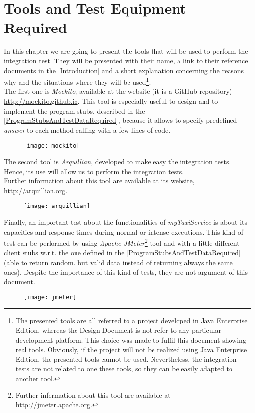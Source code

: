 \documentclass[\mainpath/main]{subfiles}
\begin{document}
\chapter{Tools and Test Equipment Required} %
\label{ToolsAndTestEquipmentRequired}

\setmyfancystyle

In this chapter we are going to present the tools that will be used to perform the integration test. They will be presented with their name, a link to their reference documents in the \autoref{Introduction} and a short explanation concerning the reasons why and the situations where they will be used\footnote{The presented tools are all referred to a project developed in Java Enterprise Edition, whereas the Design Document is not refer to any particular development platform. This choice was made to fulfil this document showing real tools. Obviously, if the project will not be realized using Java Enterprise Edition, the presented tools cannot be used. Nevertheless, the integration tests are not related to one these tools, so they can be easily adapted to another tool.}.\\
The first one is \textit{Mockito}, available at the website (it is a GitHub repository) \url{http://mockito.github.io}. This tool is especially useful to design and to implement the program stubs, described in the \autoref{ProgramStubsAndTestDataRequired}, because it allows to specify predefined \textit{answer} to each method calling with a few lines of code.

\begin{figure}[!ht]
	\centering
	\texttt{[image: mockito]}
\end{figure}

The second tool is \textit{Arquillian}, developed to make easy the integration tests. Hence, its use will allow us to perform the integration tests.\\
Further information about this tool are available at its website, \url{http://arquillian.org}.

\begin{figure}[!ht]
	\centering
	\texttt{[image: arquillian]}
\end{figure}

Finally, an important test about the functionalities of \textit{myTaxiService} is about its capacities and response times during normal or intense executions. This kind of test can be performed by using \textit{Apache JMeter}\footnote{Further information about this tool are available at \url{http://jmeter.apache.org}.} tool and with a little different client stubs w.r.t. the one defined in the \autoref{ProgramStubsAndTestDataRequired} (able to return random, but valid data instead of returning always the same ones). Despite the importance of this kind of tests, they are not argument of this document.

\begin{figure}[!ht]
	\centering
	\texttt{[image: jmeter]}
\end{figure}
\end{document}
